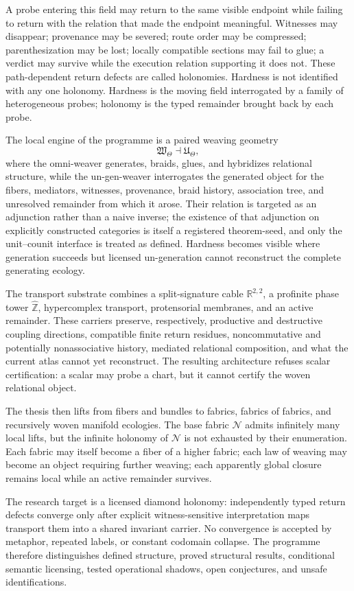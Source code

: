 \documentclass[12pt,openany]{book}
\theoremstyle{remark}
\newcommand{\Nfabric}{\mathcal N}
\newcommand{\WTheta}{\mathfrak W_{\Theta}}
\newcommand{\UTheta}{\mathfrak U_{\Theta}}
\newcommand{\wideZ}{\widehat{\mathbb Z}}
\begin{document}
A probe entering this field may return to the same visible endpoint while failing to return with the relation that made the endpoint meaningful. Witnesses may disappear; provenance may be severed; route order may be compressed; parenthesization may be lost; locally compatible sections may fail to glue; a verdict may survive while the execution relation supporting it does not. These path-dependent return defects are called holonomies. Hardness is not identified with any one holonomy. Hardness is the moving field interrogated by a family of heterogeneous probes; holonomy is the typed remainder brought back by each probe.

The local engine of the programme is a paired weaving geometry
\[
\WTheta \dashv \UTheta,
\]
where the omni-weaver generates, braids, glues, and hybridizes relational structure, while the un-gen-weaver interrogates the generated object for the fibers, mediators, witnesses, provenance, braid history, association tree, and unresolved remainder from which it arose. Their relation is targeted as an adjunction rather than a naive inverse; the existence of that adjunction on explicitly constructed categories is itself a registered theorem-seed, and only the unit--counit interface is treated as defined. Hardness becomes visible where generation succeeds but licensed un-generation cannot reconstruct the complete generating ecology.

The transport substrate combines a split-signature cable $\mathbb R^{2,2}$, a profinite phase tower $\wideZ$, hypercomplex transport, protensorial membranes, and an active remainder. These carriers preserve, respectively, productive and destructive coupling directions, compatible finite return residues, noncommutative and potentially nonassociative history, mediated relational composition, and what the current atlas cannot yet reconstruct. The resulting architecture refuses scalar certification: a scalar may probe a chart, but it cannot certify the woven relational object.

The thesis then lifts from fibers and bundles to fabrics, fabrics of fabrics, and recursively woven manifold ecologies. The base fabric $\Nfabric$ admits infinitely many local lifts, but the infinite holonomy of $\Nfabric$ is not exhausted by their enumeration. Each fabric may itself become a fiber of a higher fabric; each law of weaving may become an object requiring further weaving; each apparently global closure remains local while an active remainder survives.

The research target is a licensed diamond holonomy: independently typed return defects converge only after explicit witness-sensitive interpretation maps transport them into a shared invariant carrier. No convergence is accepted by metaphor, repeated labels, or constant codomain collapse. The programme therefore distinguishes defined structure, proved structural results, conditional semantic licensing, tested operational shadows, open conjectures, and unsafe identifications.
\end{document}
